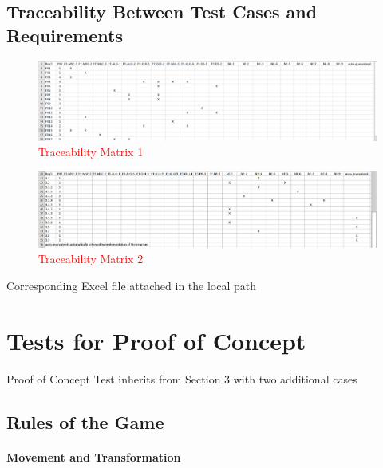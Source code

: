 \documentclass[12pt, titlepage]{article}
\begin{document}
\subsection{Traceability Between Test Cases and Requirements}

\begin{figure}[H]
  \includegraphics[width=\linewidth]{trace1.png}
  \caption{\textcolor{red}{Traceability Matrix 1}}
  \label{fig:tra1}
\end{figure}

\begin{figure}[H]
  \includegraphics[width=\linewidth]{trace2.png}
  \caption{\textcolor{red}{Traceability Matrix 2}}
  \label{fig:tra2}
\end{figure}

Corresponding Excel file attached in the local path
\newpage

\section{Tests for Proof of Concept}

Proof of Concept  Test inherits from Section 3 with two additional cases

\subsection{Rules of the Game}
		
\paragraph{Movement and Transformation}
\end{document}
